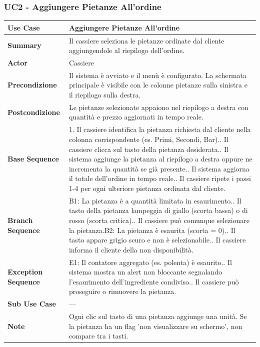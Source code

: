 \subsubsection*{UC2 - Aggiungere Pietanze All'ordine}
\begin{center}
\begin{tabular}{|p{}|p{}|}
\hline
\textbf{Use Case} & Aggiungere Pietanze All'ordine \\ \hline
\textbf{Summary} & Il cassiere seleziona le pietanze ordinate dal cliente aggiungendole al riepilogo dell'ordine. \\ \hline
\textbf{Actor} & Cassiere \\ \hline
\textbf{Precondizione} & Il sistema è avviato e il menù è configurato. La schermata principale è visibile con le colonne pietanze sulla sinistra e il riepilogo sulla destra. \\ \hline
\textbf{Postcondizione} & Le pietanze selezionate appaiono nel riepilogo a destra con quantità e prezzo aggiornati in tempo reale. \\ \hline
\textbf{Base Sequence} & 1. Il cassiere identifica la pietanza richiesta dal cliente nella colonna corrispondente (es. Primi, Secondi, Bar).\newline 2. Il cassiere clicca sul tasto della pietanza desiderata.\newline 3. Il sistema aggiunge la pietanza al riepilogo a destra oppure ne incrementa la quantità se già presente.\newline 4. Il sistema aggiorna il totale dell'ordine in tempo reale.\newline 5. Il cassiere ripete i passi 1-4 per ogni ulteriore pietanza ordinata dal cliente. \\ \hline
\textbf{Branch Sequence} & B1: La pietanza è a quantità limitata in esaurimento.\newline 2. Il tasto della pietanza lampeggia di giallo (scorta bassa) o di rosso (scorta critica).\newline 3. Il cassiere può comunque selezionare la pietanza.\newline B2: La pietanza è esaurita (scorta = 0).\newline 2. Il tasto appare grigio scuro e non è selezionabile.\newline 3. Il cassiere informa il cliente della non disponibilità. \\ \hline
\textbf{Exception Sequence} & E1: Il contatore aggregato (es. polenta) è esaurito.\newline 3. Il sistema mostra un alert non bloccante segnalando l'esaurimento dell'ingrediente condiviso.\newline 4. Il cassiere può proseguire o rimuovere la pietanza. \\ \hline
\textbf{Sub Use Case} & — \\ \hline
\textbf{Note} & Ogni clic sul tasto di una pietanza aggiunge una unità. Se la pietanza ha un flag 'non visualizzare su schermo', non compare tra i tasti. \\ \hline
\end{tabular}
\end{center}

